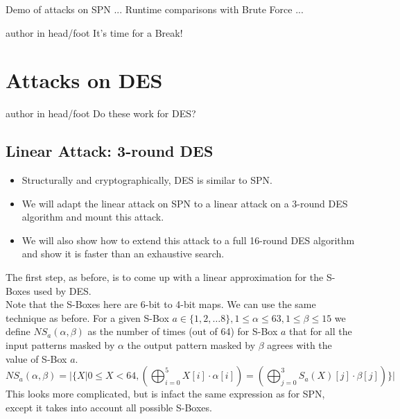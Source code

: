 \documentclass[9pt]{beamer}
\begin{document}
\begin{frame}
Demo of attacks on SPN ... Runtime comparisons with Brute Force ...

\end{frame}

\begin{frame}
\begin{beamercolorbox}[ht=2.5ex,dp=1.125ex,center,rounded=true,shadow=true]{author in head/foot}
It's time for a Break!
\end{beamercolorbox}
\end{frame}


\section{Attacks on DES}
\begin{frame}
\begin{beamercolorbox}[ht=2.5ex,dp=1.125ex,center,rounded=true,shadow=true]{author in head/foot}
Do these work for DES?
\end{beamercolorbox}
\end{frame}

\subsection{Linear Attack: 3-round DES}
\begin{frame}
\begin{itemize}
\item{Structurally and cryptographically, DES is similar to SPN.}
\item{We will adapt the linear attack on SPN to a linear attack on a 3-round DES algorithm and mount this attack.}
\item{We will also show how to extend this attack to a full 16-round DES algorithm and show it is faster than an exhaustive search.}
\end{itemize}
\end{frame}

\begin{frame}
The first step, as before, is to come up with a linear approximation for the S-Boxes used by DES.\\
\vspace{5mm}
Note that the S-Boxes here are 6-bit to 4-bit maps. We can use the same technique as before. For a given S-Box $a \in \{1, 2, \dots 8\}, 1 \leq \alpha \leq 63, 1 \leq \beta \leq 15$ we define $NS_{a}(\alpha, \beta)$ as the number of times (out of 64) for S-Box $a$ that for all the input patterns masked by $\alpha$ the output pattern masked by $\beta$ agrees with the value of S-Box $a$.
\[ NS_{a}(\alpha, \beta) = | \{ X | 0 \leq X < 64, ( \bigoplus_{i=0}^5 X[i]\cdot\alpha[i]) = (\bigoplus_{j=0}^3 S_a(X)[j] \cdot \beta[j])\} | \]
This looks more complicated, but is infact the same expression as for SPN, except it takes into account all possible S-Boxes.
\end{frame}
\end{document}
